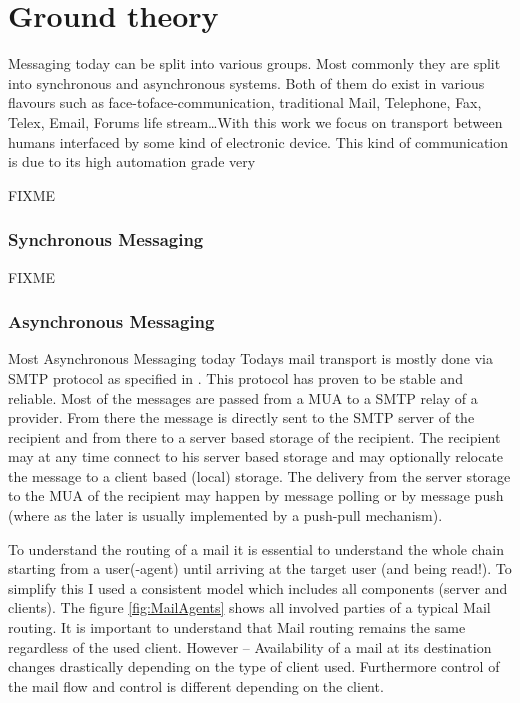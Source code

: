 \chapter{Ground theory}
Messaging today can be split into various groups. Most commonly they are split into synchronous and asynchronous systems. Both of them do exist in various flavours such as face-toface-communication, traditional Mail, Telephone, Fax, Telex, Email, Forums life stream\ldots With this work we focus on transport between humans interfaced by some kind of electronic device. This kind of communication is due to its high automation grade very 

FIXME

\subsection{Synchronous Messaging}

FIXME

\subsection{Asynchronous Messaging}
Most Asynchronous Messaging today
Todays mail transport is mostly done via SMTP protocol as specified in \cite{RFC5321}. This protocol has proven to be stable and reliable. Most of the messages are passed from a MUA to a SMTP relay of a provider. From there the message is directly sent to the SMTP server of the recipient and from there to a server based storage of the recipient. The recipient may at any time connect to his server based storage and may optionally relocate the message to a client based (local) storage. The delivery from the server storage to the MUA of the recipient may happen by message polling or by message push (where as the later is usually implemented by a push-pull mechanism).\par

To understand the routing of a mail it is essential to understand the whole chain starting from a user(-agent) until arriving at the target user (and being read!). To simplify this I used a consistent model which includes all components (server and clients). The figure \ref{fig:MailAgents} shows all involved parties of a typical Mail routing. It is important to understand that Mail routing remains the same regardless of the used client. However -- Availability of a mail at its destination changes drastically depending on the type of client used. Furthermore control of the mail flow and control is different depending on the client.\par

